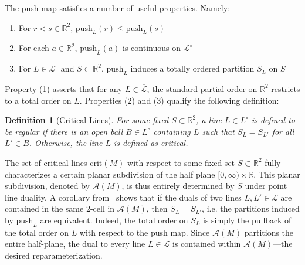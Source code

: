 \documentclass{article} %
\newtheorem{definition}{Definition}
\begin{document}
The push map satisfies a number of useful properties. Namely: 
\begin{enumerate}
	\item For $r < s \in \mathbb{R}^2$, $\mathrm{push}_L(r) \leq \mathrm{push}_L(s)$
	\item For each $a \in \mathbb{R}^2$, $\mathrm{push}_L(a)$ is continuous on $\mathcal{L}^\circ$
	\item For $L \in \mathcal{L}^\circ$ and $S \subset \mathbb{R}^2$, $\mathrm{push}_L$ induces a totally ordered partition $S_L$ on $S$ 
\end{enumerate}
Property (1) asserts that for any $L \in \overline{\mathcal{L}}$, the standard partial order on $\mathbb{R}^2$ restricts to a total order on $L$. Properties (2) and (3) qualify the following definition:
\begin{definition}[Critical Lines]
	For some fixed $S \subset \mathbb{R}^2$, a line $L \in L^\circ$ is defined to be \emph{regular} if there is an open ball $B \in L^\circ$ containing $L$ such that $S_L = S_{L'}$ for all $L' \in B$. Otherwise, the line $L$ is defined as \emph{critical}. 
\end{definition}
\noindent The set of critical lines $\mathrm{crit}(M)$ with respect to some fixed set $S \subset \mathbb{R}^2$ fully characterizes a certain planar subdivision of the half plane $[0, \infty) \times \mathbb{R}$. 
This planar subdivision, denoted by $\mathcal{A}(M)$, is thus entirely determined by $S$ under point line duality.
A corollary from~\cite{lesnick2015interactive} shows that if the duals of two lines $L, L' \in \mathcal{L}$ are contained in the same $2$-cell in $\mathcal{A}(M)$, then $S_L = S_{L'}$, i.e. the partitions induced by $\mathrm{push}_L$ are equivalent. Indeed, the total order on $S_L$ is simply the pullback of the total order on $L$ with respect to the push map.
Since $\mathcal{A}(M)$ partitions the entire half-plane, the dual to every line $L \in \mathcal{L}$ is contained within $\mathcal{A}(M)$---the desired reparameterization. 
\end{document}
